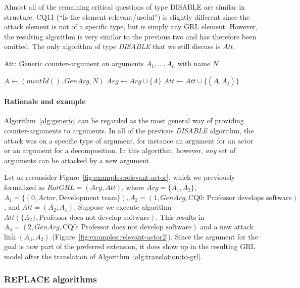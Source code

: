 Almost all of the remaining critical questions of type DISABLE are similar in structure. CQ11 (``Is the element relevant/useful'') is slightly different since the attack element is not of a specific type, but is simply any GRL element. However, the resulting algorithm is very similar to the previous two and has therefore been omitted. The only algorithm of type \emph{DISABLE} that we still discuss is $Att$.

\begin{algorithm}[h]
  \caption{Att: Generic counter-argument on arguments $A_1,\ldots,A_n$ with name $N$}\label{alg:generic}
  \begin{algorithmic}[1]
    \State $A \leftarrow (mintId(),GenArg, N)$\label{alg:generic:arg}
    \State $Arg\leftarrow Arg \cup \{A\}$\label{alg:generic:addarg}
    \label{alg:generic:for}
      \State $Att \leftarrow Att \cup \{(A,A_j)\}$\label{alg:generic:att}
    \EndFor
    \EndProcedure
  \end{algorithmic}
\end{algorithm}

\paragraph{Rationale and example} Algorithm~\ref{alg:generic} can be regarded as the most general way of providing counter-arguments to arguments. In all of the previous \emph{DISABLE} algorithm, the attack was on a specific type of argument, for instance an argument for an actor or an argument for a decomposition. In this algorithm, however, \emph{any} set of arguments can be attacked by a new argument.

Let us reconsider Figure~\ref{fig:examples:relevant-actor}, which we previously formalized as $RatGRL=(Arg,Att)$, where $Arg=\{A_1,A_2\}$, $A_1=\{(0,Actor,\text{Development team}\}), A_2=(1, GenArg, \text{CQ0: Professor develops software})$, and $Att=(A_2,A_1)$. Suppose we execute algorithm $Att(\{A_2\}, \text{Professor does not develop software})$. This results in $A_3=(2, GenArg, \text{CQ0: Professor does not develop software})$ and a new attack link $(A_3,A_2)$ (Figure~\ref{fig:examples:relevant-actor2}). Since the argument for the goal is now part of the preferred extension, it does show up in the resulting GRL model after the translation of Algorithm~\ref{alg:translation:to-grl}.

\subsubsection{REPLACE algorithms}

